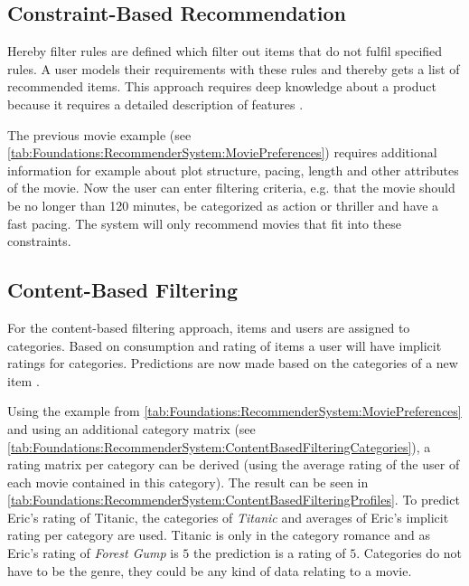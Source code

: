 \subsection{Constraint-Based Recommendation}
Hereby filter rules are defined which filter out items that do not fulfil specified rules. A user models their requirements with these rules and thereby gets a list of recommended items. This approach requires deep knowledge about a product because it requires a detailed description of features  \cite[~ p. 12]{felfernigDecisionTasksBasic2018}.

The previous movie example (see \autoref{tab:Foundations:RecommenderSystem:MoviePreferences}) requires additional information for example about plot structure, pacing, length and other attributes of the movie. Now the user can enter filtering criteria, e.g. that the movie should be no longer than 120 minutes, be categorized as action or thriller and have a fast pacing. The system will only recommend movies that fit into these constraints.

\subsection{Content-Based Filtering}
For the content-based filtering approach, items and users are assigned to categories. Based on consumption and rating of items a user will have implicit ratings for categories. Predictions are now made based on the categories of a new item \cite[~ pp. 10, 11]{felfernigDecisionTasksBasic2018}.

Using the example from \autoref{tab:Foundations:RecommenderSystem:MoviePreferences} and using an additional category matrix (see \autoref{tab:Foundations:RecommenderSystem:ContentBasedFilteringCategories}), a rating matrix per category can be derived (using the average rating of the user of each movie contained in this category). The result can be seen in \autoref{tab:Foundations:RecommenderSystem:ContentBasedFilteringProfiles}. To predict Eric's rating of Titanic, the categories of \textit{Titanic} and averages of Eric's implicit rating per category are used. Titanic is only in the category romance and as Eric's rating of \textit{Forest Gump} is $5$ the prediction is a rating of $5$. Categories do not have to be the genre, they could be any kind of data relating to a movie.

